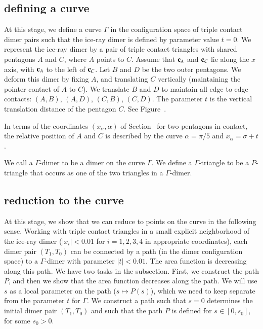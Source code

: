 \subsection{defining a curve}

At this stage, we define a curve $\Gamma$ in the configuration space
of triple contact dimer pairs such that the ice-ray dimer is defined
by parameter value $t=0$.  We represent the ice-ray dimer by a pair of
triple contact triangles with shared pentagons $A$ and $C$, where $A$
points to $C$.  Assume that ${\mathbf c}_A$ and ${\mathbf c}_C$ lie along the $x$ axis,
with ${\mathbf c}_A$ to the left of ${\mathbf c}_C$.  Let $B$ and $D$ be the two outer
pentagons.  We deform this dimer by fixing $A$, and translating $C$
vertically (maintaining the pointer contact of $A$ to $C$).  We
translate $B$ and $D$ to maintain all edge to edge contacts: $(A,B)$,
$(A,D)$, $(C,B)$, $(C,D)$.  The parameter $t$ is the vertical
translation distance of the pentagon $C$.  See
Figure~.


In terms of the coordinates $(x_\alpha,\alpha)$ of
Section~ for two pentagons in contact, the relative
position of $A$ and $C$ is described by the curve $\alpha=\pi/5$ and
$x_\alpha = \sigma+t$.

We call a $\Gamma$-dimer to be a dimer on the curve $\Gamma$.  We
define a $\Gamma$-triangle to be a $P$-triangle that occurs as one of
the two triangles in a $\Gamma$-dimer.


\subsection{reduction to the curve}

At this stage, we show that we can reduce to points on the curve in
the following sense.  Working with triple contact triangles in a small
explicit neighborhood of the ice-ray dimer ($|x_i|<0.01$ for
$i=1,2,3,4$ in appropriate coordinates), each dimer pair $(T_1,T_0)$
can be connected by a path (in the dimer configuration space) to a
$\Gamma$-dimer with parameter $|t|<0.01$.  The area function is
decreasing along this path.  We have two tasks in the subsection.
First, we construct the path $P$, and then we show that the area
function decreases along the path.  We will use $s$ as a local
parameter on the path ($s\mapsto P(s)$), which we need to keep
separate from the parameter $t$ for $\Gamma$.  We construct a path
such that $s=0$ determines the initial dimer pair $(T_1,T_0)$ and such
that the path $P$ is defined for $s\in [0,s_0]$, for some $s_0>0$.

